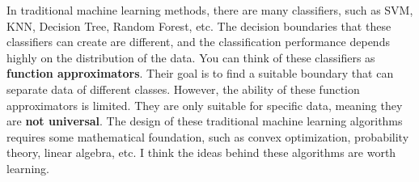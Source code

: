 \documentclass[oneside]{book}
\begin{document}
In traditional machine learning methods, there are many classifiers, such as SVM, KNN, Decision Tree, Random Forest, etc. 
The decision boundaries that these classifiers can create are different, and the classification performance depends highly on the distribution of the data.
You can think of these classifiers as \textbf{function approximators}. Their goal is to find a suitable boundary that can separate data of different classes.
However, the ability of these function approximators is limited. They are only suitable for specific data, meaning they are \textbf{not universal}.
The design of these traditional machine learning algorithms requires some mathematical foundation, such as convex optimization, probability theory, linear algebra, etc. I think the ideas behind these algorithms are worth learning.
\end{document}
